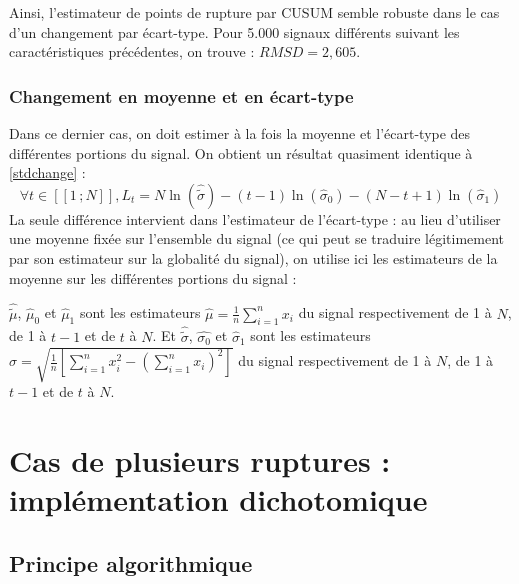 \documentclass[french,11pt,notitlepage]{report}
\begin{document}
	Ainsi, l'estimateur de points de rupture par CUSUM semble robuste dans le cas d'un changement par écart-type. Pour 5.000 signaux différents suivant les caractéristiques précédentes, on trouve : $RMSD = 2,605$.
	
	
	\subsection{Changement en moyenne et en écart-type}
	
	
	Dans ce dernier cas, on doit estimer à la fois la moyenne et l'écart-type des différentes portions du signal. On obtient un résultat quasiment identique à \ref{stdchange} :
	\begin{equation}
		\forall t \in [\![1\,;N]\!], L_t = N\ln (\hat{\tilde\sigma}) - (t-1) \ln (\hat\sigma_0) - (N - t + 1) \ln (\hat\sigma_1)
		\label{bothchange}
	\end{equation}
	La seule différence intervient dans l'estimateur de l'écart-type :
	au lieu d'utiliser une moyenne fixée sur l'ensemble du signal (ce qui peut se traduire légitimement par son estimateur sur la globalité du signal),
	on utilise ici les estimateurs  de la moyenne sur les différentes portions du signal :
	
	$\hat{\tilde\mu}$, $\hat\mu_0$ et $\hat\mu_1$ sont les estimateurs $\hat\mu=\frac1n\sum_{i=1}^nx_i$ du signal respectivement de 1 à $N$, de 1 à $t-1$ et de $t$ à $N$.
	Et $\hat{\tilde\sigma}$, $\hat{\sigma_0}$ et $\hat\sigma_1$ sont les estimateurs $\hat\sigma=\sqrt{\frac1n\left[\sum_{i=1}^nx_i^2-(\sum_{i=1}^nx_i)^2\right]}$ du signal respectivement de 1 à $N$, de 1 à $t-1$ et de $t$ à $N$.	

	
	
	\chapter{Cas de plusieurs ruptures : implémentation dichotomique}



	\section{Principe algorithmique}
\end{document}
